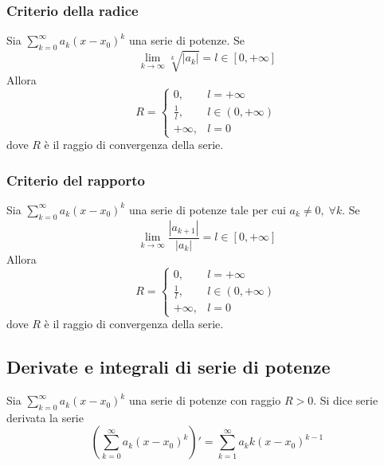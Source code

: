            \subsubsection{Criterio della radice}
                Sia $\sum_{k = 0}^{\infty} a_{k}(x - x_{0})^{k}$ una serie di potenze.
                Se
                \[
                    \lim_{k \rightarrow \infty} \sqrt[k]{|a_{k}|} = l \in [0, +\infty]
                \]
                Allora
                \[
                    R = \begin{cases}
                        0, & l = +\infty \\
                        \displaystyle \frac{1}{l}, & l \in (0, +\infty) \\
                        +\infty, & l = 0
                    \end{cases}
                \]
                dove $R$ è il raggio di convergenza della serie.

            \subsubsection{Criterio del rapporto}
                Sia $\sum_{k = 0}^{\infty} a_{k}(x - x_{0})^{k}$ una serie di potenze tale per cui $a_{k} \neq 0, \; \forall k$.
                Se
                \[
                    \lim_{k \rightarrow \infty} \frac{|a_{k+1}|}{|a_{k}|} = l \in [0, +\infty]
                \]
                Allora
                \[
                    R = \begin{cases}
                        0, & l = +\infty \\
                        \displaystyle \frac{1}{l}, & l \in (0, +\infty) \\
                        +\infty, & l = 0
                    \end{cases}
                \]
                dove $R$ è il raggio di convergenza della serie.



        \subsection{Derivate e integrali di serie di potenze}
            \begin{definition}
                Sia $\sum_{k = 0}^{\infty} a_{k}(x - x_{0})^{k}$ una serie di potenze con raggio $R > 0$.
                Si dice serie derivata la serie
                \[
                    \left( \sum_{k = 0}^{\infty} a_{k}(x - x_{0})^{k}\right)' = \sum_{k = 1}^{\infty} a_{k}k(x - x_{0})^{k - 1}
                \]
            \end{definition}

